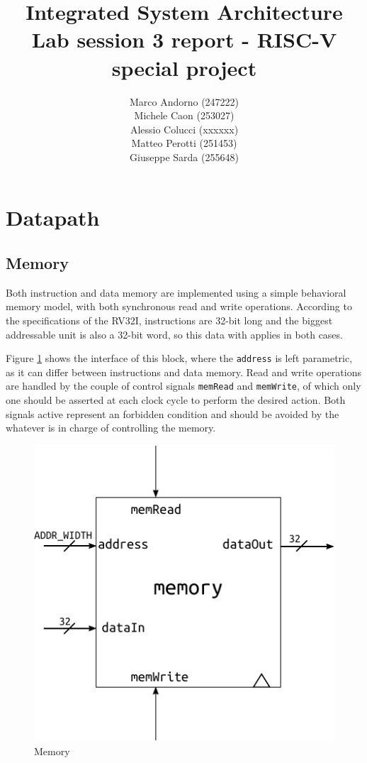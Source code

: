 \documentclass[a4paper]{article}
\title{Integrated System Architecture \\ Lab session 3 report - RISC-V special project}
\author{Marco Andorno (247222)\\ Michele Caon (253027) \\ Alessio Colucci (xxxxxx) \\ Matteo Perotti (251453) \\ Giuseppe Sarda (255648)}
\begin{document}
\maketitle

\section{Datapath}
\subsection{Memory}
Both instruction and data memory are implemented using a simple behavioral memory model, with both synchronous read and write operations. According to the specifications of the RV32I, instructions are 32-bit long and the biggest addressable unit is also a 32-bit word, so this data with applies in both cases.

Figure \ref{fig:memory} shows the interface of this block, where the \texttt{address} is left parametric, as it can differ between instructions and data memory. Read and write operations are handled by the couple of control signals \texttt{memRead} and \texttt{memWrite}, of which only one should be asserted at each clock cycle to perform the desired action. Both signals active represent an forbidden condition and should be avoided by the whatever is in charge of controlling the memory.

\begin{figure}[hbtp]
    \centering
    \includegraphics[scale=1]{../memory/ref/schematic/memory.pdf}
    \caption{Memory}
    \label{fig:memory}
\end{figure}
\end{document}
